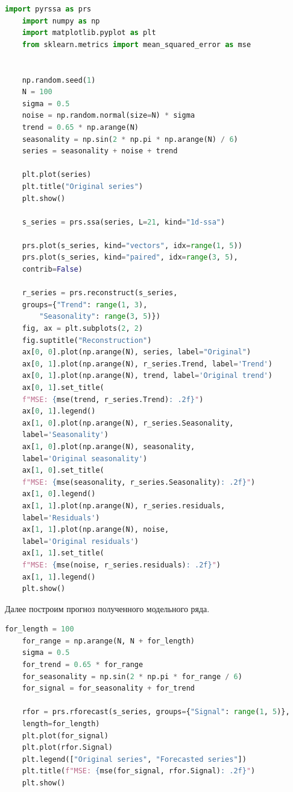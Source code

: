 \documentclass[specialist,
			   substylefile = spbu_report.rtx,
			   subf,href,colorlinks=true, 12pt]{disser}
\begin{document}
\begin{lstlisting}[language=Python, caption=Программный код для разложения и восстановления модельного ряда на Python.]
	import pyrssa as prs
	import numpy as np
	import matplotlib.pyplot as plt
	from sklearn.metrics import mean_squared_error as mse
	
	
	np.random.seed(1)
	N = 100
	sigma = 0.5
	noise = np.random.normal(size=N) * sigma
	trend = 0.65 * np.arange(N)
	seasonality = np.sin(2 * np.pi * np.arange(N) / 6)
	series = seasonality + noise + trend
	
	plt.plot(series)
	plt.title("Original series")
	plt.show()
	
	s_series = prs.ssa(series, L=21, kind="1d-ssa")
	
	prs.plot(s_series, kind="vectors", idx=range(1, 5))
	prs.plot(s_series, kind="paired", idx=range(3, 5),
	contrib=False)
	
	r_series = prs.reconstruct(s_series,
	groups={"Trend": range(1, 3),
		"Seasonality": range(3, 5)})
	fig, ax = plt.subplots(2, 2)
	fig.suptitle("Reconstruction")
	ax[0, 0].plot(np.arange(N), series, label="Original")
	ax[0, 1].plot(np.arange(N), r_series.Trend, label='Trend')
	ax[0, 1].plot(np.arange(N), trend, label='Original trend')
	ax[0, 1].set_title(
	f"MSE: {mse(trend, r_series.Trend): .2f}")
	ax[0, 1].legend()
	ax[1, 0].plot(np.arange(N), r_series.Seasonality,
	label='Seasonality')
	ax[1, 0].plot(np.arange(N), seasonality,
	label='Original seasonality')
	ax[1, 0].set_title(
	f"MSE: {mse(seasonality, r_series.Seasonality): .2f}")
	ax[1, 0].legend()
	ax[1, 1].plot(np.arange(N), r_series.residuals,
	label='Residuals')
	ax[1, 1].plot(np.arange(N), noise,
	label='Original residuals')
	ax[1, 1].set_title(
	f"MSE: {mse(noise, r_series.residuals): .2f}")
	ax[1, 1].legend()
	plt.show()
\end{lstlisting}

Далее построим прогноз полученного модельного ряда.

\begin{lstlisting}[language=Python, caption=Программный код для прогноза модельного ряда на Python.]
	for_length = 100
	for_range = np.arange(N, N + for_length)
	sigma = 0.5
	for_trend = 0.65 * for_range
	for_seasonality = np.sin(2 * np.pi * for_range / 6)
	for_signal = for_seasonality + for_trend
	
	rfor = prs.rforecast(s_series, groups={"Signal": range(1, 5)},
	length=for_length)
	plt.plot(for_signal)
	plt.plot(rfor.Signal)
	plt.legend(["Original series", "Forecasted series"])
	plt.title(f"MSE: {mse(for_signal, rfor.Signal): .2f}")
	plt.show()
\end{lstlisting}
\end{document}
